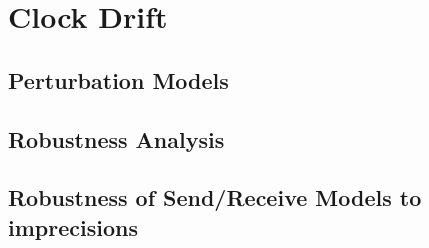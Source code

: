 \chapter{Clock Drift}\label{chap:6}
\minitoc
\section{Perturbation Models}
\section{Robustness Analysis}
\section{Robustness of Send/Receive Models to imprecisions}


